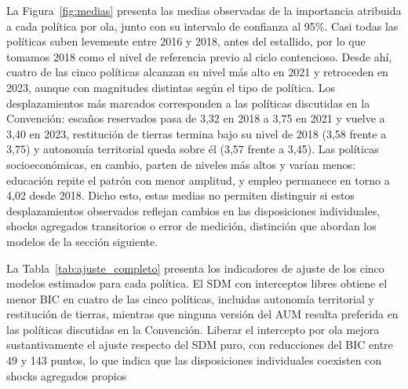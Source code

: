 \documentclass{article}
\begin{document}
La Figura~\ref{fig:medias} presenta las medias observadas de la importancia atribuida a cada política por ola, junto con su intervalo de confianza al 95\%. Casi todas las políticas suben levemente entre 2016 y 2018, antes del estallido, por lo que tomamos 2018 como el nivel de referencia previo al ciclo contencioso. Desde ahí, cuatro de las cinco políticas alcanzan su nivel más alto en 2021 y retroceden en 2023, aunque con magnitudes distintas según el tipo de política. Los desplazamientos más marcados corresponden a las políticas discutidas en la Convención: escaños reservados pasa de 3,32 en 2018 a 3,75 en 2021 y vuelve a 3,40 en 2023, restitución de tierras termina bajo su nivel de 2018 (3,58 frente a 3,75) y autonomía territorial queda sobre él (3,57 frente a 3,45). Las políticas socioeconómicas, en cambio, parten de niveles más altos y varían menos: educación repite el patrón con menor amplitud, y empleo permanece en torno a 4,02 desde 2018. Dicho esto, estas medias no permiten distinguir si estos desplazamientos observados reflejan cambios en las disposiciones individuales, shocks agregados transitorios o error de medición, distinción que abordan los modelos de la sección siguiente.

La Tabla~\ref{tab:ajuste_completo} presenta los indicadores de ajuste de los cinco modelos estimados para cada política. El SDM con interceptos libres obtiene el menor BIC en cuatro de las cinco políticas, incluidas autonomía territorial y restitución de tierras, mientras que ninguna versión del AUM resulta preferida en las políticas discutidas en la Convención. Liberar el intercepto por ola mejora sustantivamente el ajuste respecto del SDM puro, con reducciones del BIC entre 49 y 143 puntos, lo que indica que las disposiciones individuales coexisten con shocks agregados propios 
\end{document}
